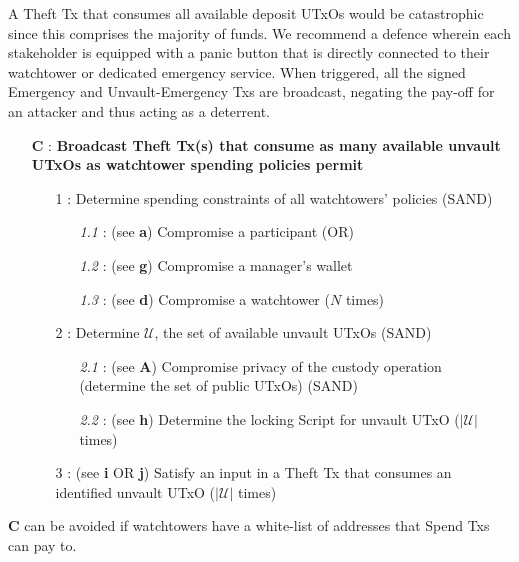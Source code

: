 \documentclass[runningheads]{llncs}
\begin{document}
\noindent A Theft Tx that consumes all available deposit UTxOs would be catastrophic since this comprises the majority of funds. We recommend a defence wherein each stakeholder is equipped with a panic button that is directly connected to their watchtower or dedicated emergency service. When triggered, all the signed Emergency and Unvault-Emergency Txs are broadcast, negating the pay-off for an attacker and thus acting as a deterrent. 

{\footnotesize
\begin{itemize}[noitemsep,parsep=0pt,partopsep=0pt, leftmargin=0.7cm]
\item[\textbf{C} :] \textbf{Broadcast Theft Tx(s) that consume as many available unvault UTxOs as watchtower spending policies permit}
\begin{itemize}[noitemsep,topsep=0pt,parsep=0pt,partopsep=0pt, leftmargin=0.8cm]
\item[1 :] Determine spending constraints of all watchtowers' policies (SAND)
\begin{itemize}[noitemsep,topsep=0pt,parsep=0pt,partopsep=0pt, leftmargin=0.9cm]
\item[\textit{1.1} :] (see \textbf{a}) Compromise a participant (OR)
\item[\textit{1.2} :] (see \textbf{g}) Compromise a manager's wallet 
\item[\textit{1.3} :] (see \textbf{d}) Compromise a watchtower ($N$ times)
\end{itemize}
\item[2 :] Determine $\mathcal{U}$, the set of available unvault UTxOs (SAND)
\begin{itemize}[noitemsep,topsep=0pt,parsep=0pt,partopsep=0pt, leftmargin=0.9cm]
\item[\textit{2.1} :] (see \textbf{A}) Compromise privacy of the custody operation (determine the set of public UTxOs) (SAND)
\item[\textit{2.2} :] (see \textbf{h}) Determine the locking Script for unvault UTxO ($|\mathcal{U}|$ times)
\end{itemize}
\item[3 :] (see \textbf{i} OR \textbf{j}) Satisfy  an  input  in  a  Theft  Tx  that  consumes  an  identified  unvault UTxO ($|\mathcal{U}|$ times)
\end{itemize}
\end{itemize}
}

\noindent \textbf{C} can be avoided if watchtowers have a white-list of addresses that Spend Txs can pay to.
\end{document}
